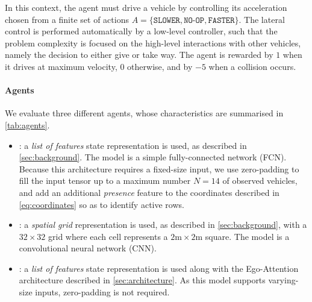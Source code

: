 \documentclass{article}
\begin{document}
In this context, the agent must drive a vehicle by controlling its acceleration chosen from a finite set of actions $A = \{\texttt{SLOWER}, \texttt{NO-OP}, \texttt{FASTER}\}$. The lateral control is performed automatically by a low-level controller, such that the problem complexity is focused on the high-level interactions with other vehicles, namely the decision to either give or take way. The agent is rewarded by $1$ when it drives at maximum velocity, $0$ otherwise, and by $-5$ when a collision occurs.

\paragraph{Agents}

We evaluate three different agents, whose characteristics are summarised in \autoref{tab:agents}.
\begin{itemize}
	\item \MLPL: a \emph{list of features} state representation is used, as described in \autoref{sec:background}. The model is a simple fully-connected network (FCN). Because this architecture requires a fixed-size input, we use zero-padding to fill the input tensor up to a maximum number $N=14$ of observed vehicles, and add an additional \emph{presence} feature to the coordinates described in \eqref{eq:coordinates} so as to identify active rows.
	\item \CNNG: a \emph{spatial grid} representation is used, as described in \autoref{sec:background}, with a $32 \times 32$ grid where each cell represents a $2\text{m}\times 2$m square. The model is a convolutional neural network (CNN).
	\item \EgoAtt: a \emph{list of features} state representation is used along with the Ego-Attention architecture described in \autoref{sec:architecture}. As this model supports varying-size inputs, zero-padding is not required.
\end{itemize}
\end{document}
